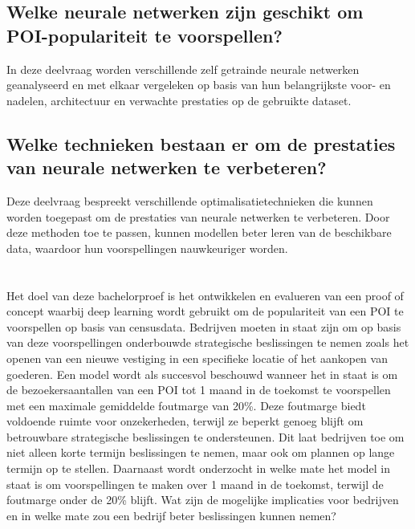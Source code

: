 \subsection{Welke neurale netwerken zijn geschikt om POI-populariteit te voorspellen?}
In deze deelvraag worden verschillende zelf getrainde neurale netwerken geanalyseerd en met elkaar vergeleken op basis van hun belangrijkste voor- en nadelen, architectuur en verwachte prestaties op de gebruikte dataset.

\subsection{Welke technieken bestaan er om de prestaties van neurale netwerken te verbeteren?}
Deze deelvraag bespreekt verschillende optimalisatietechnieken die kunnen worden toegepast om de prestaties van neurale netwerken te verbeteren. Door deze methoden toe te passen, kunnen modellen beter leren van de beschikbare data, waardoor hun voorspellingen nauwkeuriger worden.

\section{}%
\label{sec:onderzoeksdoelstelling}


Het doel van deze bachelorproef is het ontwikkelen en evalueren van een proof of concept waarbij deep learning wordt gebruikt om de populariteit van een POI te voorspellen op basis van censusdata. Bedrijven moeten in staat zijn om op basis van deze voorspellingen onderbouwde strategische beslissingen te nemen zoals het openen van een nieuwe vestiging in een specifieke locatie of het aankopen van goederen.
Een model wordt als succesvol beschouwd wanneer het in staat is om de bezoekersaantallen van een POI tot 1 maand in de toekomst te voorspellen met een maximale gemiddelde foutmarge van 20\%. Deze foutmarge biedt voldoende ruimte voor onzekerheden, terwijl ze beperkt genoeg blijft om betrouwbare strategische beslissingen te ondersteunen. Dit laat bedrijven toe om niet alleen korte termijn beslissingen te nemen, maar ook om plannen op lange termijn op te stellen.
Daarnaast wordt onderzocht in welke mate het model in staat is om voorspellingen te maken over 1 maand in de toekomst, terwijl de foutmarge onder de 20\% blijft. Wat zijn de mogelijke implicaties voor bedrijven en in welke mate zou een bedrijf beter beslissingen kunnen nemen?

